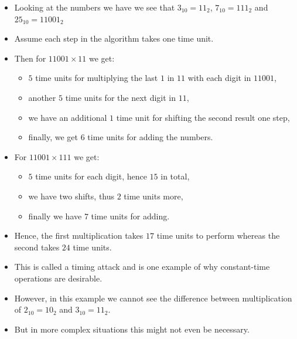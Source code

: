 \begin{frame}
  \begin{itemize}
    \item Looking at the numbers we have we see that \(3_{10} = 11_2\), 
      \(7_{10} = 111_2\) and \(25_{10} = 11001_2\)

    \item Assume each step in the algorithm takes one time unit.

    \item Then for \(11001\times 11\) we get:
      \begin{itemize}
        \item \(5\) time units for multiplying the last \(1\) in \(11\) with 
          each digit in \(11001\),

        \item another \(5\) time units for the next digit in \(11\),

        \item we have an additional \(1\) time unit for shifting the second 
          result one step,

        \item finally, we get \(6\) time units for adding the numbers.
      \end{itemize}

    \item For \(11001\times 111\) we get:
      \begin{itemize}
        \item \(5\) time units for each digit, hence \(15\) in total,

        \item we have two shifts, thus \(2\) time units more,

        \item finally we have \(7\) time units for adding.
      \end{itemize}
  \end{itemize}
\end{frame}

\begin{frame}
  \begin{itemize}
    \item Hence, the first multiplication takes \(17\) time units to perform 
      whereas the second takes \(24\) time units.

    \item This is called a timing attack and is one example of why 
      constant-time operations are desirable.

    \item However, in this example we cannot see the difference between 
      multiplication of \(2_{10} = 10_2\) and \(3_{10} = 11_2\).

    \item But in more complex situations this might not even be necessary.

  \end{itemize}
\end{frame}


